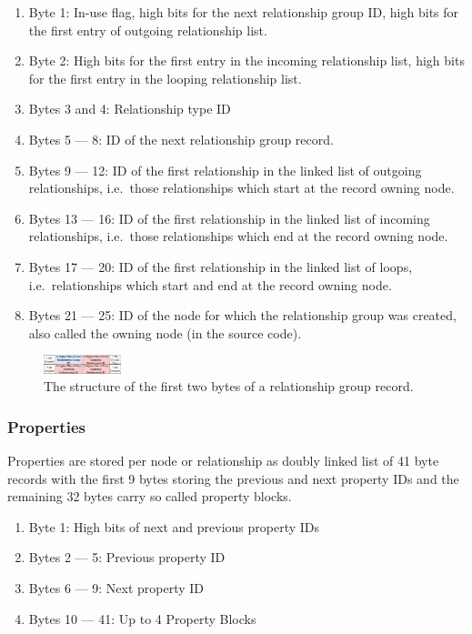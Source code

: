 \documentclass[a4paper,10pt]{article}
\begin{document}
            \begin{enumerate}
                \item Byte 1: In-use flag, high bits for the next relationship group ID, high bits for the first entry of outgoing relationship list.
                \item Byte 2: High bits for the first entry in the incoming relationship list, high bits for the first entry in the looping relationship list.
                \item Bytes 3 and 4: Relationship type ID
                \item Bytes 5 --- 8: ID of the next relationship group record.
                \item Bytes 9 --- 12: ID of the first relationship in the linked list of outgoing relationships, i.e.\ those relationships which start at the record owning node.
                \item Bytes 13 --- 16: ID of the first relationship in the linked list of incoming relationships, i.e.\ those relationships which end at the record owning node.
                \item Bytes 17 --- 20: ID of the first relationship in the linked list of loops, i.e.\ relationships which start and end at the record owning node.
                \item Bytes 21 --- 25: ID of the node for which the relationship group was created, also called the owning node (in the source code).
            \end{enumerate}
            
            \begin{figure}[htp]\label{rel_group_first_bytes}
                \begin{center}
                    \includegraphics[keepaspectratio,height=0.2\textheight,width=0.2\textwidth]{img/03_record/relationship/relationship_group_first_bytes.png}
                \end{center}
                \caption{The structure of the first two bytes of a relationship group record.} %
            \end{figure}
        

        \subsubsection{Properties}
            Properties are stored per node or relationship as doubly linked list of 41 byte records with the first 9 bytes storing the previous and next property IDs and the remaining 32 bytes carry so called property blocks.
            \begin{enumerate}
            \item Byte 1: High bits of next and previous property IDs
            \item Bytes 2 --- 5: Previous property ID
            \item Bytes 6 --- 9: Next property ID
            \item Bytes 10 --- 41: Up to 4 Property Blocks
            \end{enumerate}
            
\end{document}
